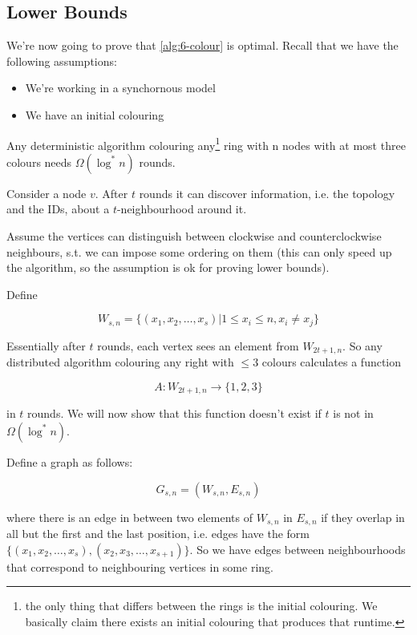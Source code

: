 \subsection{Lower Bounds}

We're now going to prove that \ref{alg:6-colour} is optimal. Recall that we have the following assumptions:

\begin{itemize}
\item We're working in a synchornous model
\item We have an initial colouring
\end{itemize}

\begin{thm}\label{thm:ring_color_lowerbound} Any deterministic algorithm colouring any\footnote{the only thing that differs between the rings is the initial colouring. We basically claim there exists an initial colouring that produces that runtime.} ring with n nodes with at most three colours needs $\Omega(\log^* n)$ rounds.
\end{thm}

Consider a node $v$. After $t$ rounds it can discover information, i.e. the topology and the IDs, about a $t$-neighbourhood around it.

Assume the vertices can distinguish between clockwise and counterclockwise neighbours, s.t. we can impose some ordering on them (this can only speed up the algorithm, so the assumption is ok for proving lower bounds).

Define

\[W_{s,n} = \{(x_1,x_2,\ldots,x_s) | 1 \leq x_i\leq n, x_i\neq x_j\}\]

Essentially after $t$ rounds, each vertex sees an element from $W_{2t+1,n}$. So any distributed algorithm colouring any right with $\leq 3$ colours calculates a function

\[A:W_{2t+1,n} \longrightarrow \{1,2,3\}\]

in $t$ rounds. We will now show that this function doesn't exist if $t$ is not in $\Omega(\log^*n)$.

Define a graph as follows:

\[G_{s,n} = (W_{s,n},E_{s,n})\]

where there is an edge in between two elements of $W_{s,n}$ in $E_{s,n}$ if they overlap in all but the first and the last position, i.e. edges have the form $\{(x_1,x_2,\ldots,x_s),(x_2,x_3,\ldots,x_{s+1})\}$. So we have edges between neighbourhoods that correspond to neighbouring vertices in some ring.

